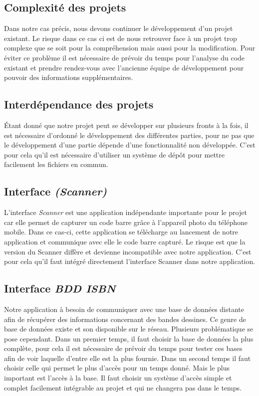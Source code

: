 \documentclass[etudiants]{support-iutrs}
\begin{document}
\subsection{Complexité des projets}

Dans notre cas précis, nous devons continuer le développement d'un projet existant. Le risque dans ce cas ci est de nous retrouver face à un projet trop complexe que se soit pour la compréhension mais aussi pour la modification. Pour éviter ce problème il est nécessaire de prévoir du temps pour l'analyse du code existant et prendre rendez-vous avec l'ancienne équipe de développement pour pouvoir des informations supplémentaires. 

\subsection{Interdépendance des projets}

Étant donné que notre projet peut se développer sur plusieurs fronts à la fois, il est nécessaire d'ordonné le développement des différentes parties, pour ne pas que le développement d'une partie dépende d'une fonctionnalité non développée. C'est pour cela qu'il est nécessaire d'utiliser un système de dépôt pour mettre facilement les fichiers en commun.

\subsection{Interface \emph{(Scanner)}}

L'interface \emph{Scanner} est une application indépendante importante pour le projet car elle permet de capturer un code barre grâce à l'appareil photo du téléphone mobile. Dans ce cas-ci, cette application se télécharge au lancement de notre application et communique avec elle le code barre capturé. Le risque est que la version du Scanner diffère et devienne incompatible avec notre application. C'est pour cela qu'il faut intégré directement l'interface Scanner dans notre application.

\subsection{Interface \emph{BDD ISBN}}

Notre application à besoin de communiquer avec une base de données distante afin de récupérer des informations concernant des bandes dessines. Ce genre de base de données existe et son disponible sur le réseau. Plusieurs problématique se pose cependant. Dans un premier temps, il faut choisir la base de données la plus complète, pour cela il est nécessaire de prévoir du temps pour tester ces bases afin de voir laquelle d'entre elle est la plus fournie. Dans un second temps il faut choisir celle qui permet le plus d'accès pour un temps donné. Mais le plus important est l'accès à la base. Il faut choisir un système d'accès simple et complet facilement intégrable au projet et qui ne changera pas dans le temps.
\end{document}
